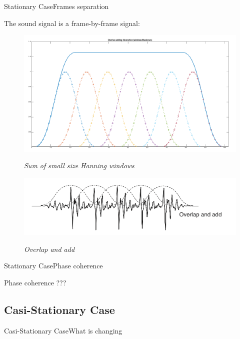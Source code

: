 \documentclass{bredelebeamer}
\begin{document}
\begin{frame}{Stationary Case}{Frames separation}

The sound signal is  a frame-by-frame signal: \\

\begin{figure}

	{\includegraphics[scale=0.3]{overlap2.png}}
	\caption{\it Sum of small size Hanning windows}
\end{figure}
\begin{figure}
	{\includegraphics[scale=0.25]{overlap1.png}}
	\caption{\it Overlap and add}
\end{figure}
\end{frame}
\begin{frame}{Stationary Case}{Phase coherence}

Phase coherence ???
\end{frame}
\subsection{Casi-Stationary Case}
\begin{frame}{Casi-Stationary Case}{What is changing}

\end{frame}
\end{document}
